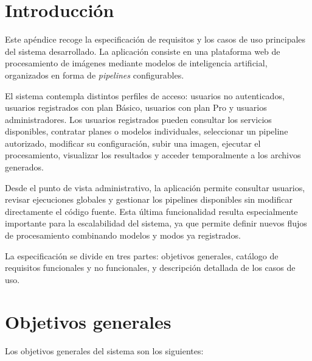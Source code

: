 
\section{Introducción}

Este apéndice recoge la especificación de requisitos y los casos de uso principales del sistema desarrollado. La aplicación consiste en una plataforma web de procesamiento de imágenes mediante modelos de inteligencia artificial, organizados en forma de \emph{pipelines} configurables.

El sistema contempla distintos perfiles de acceso: usuarios no autenticados, usuarios registrados con plan Básico, usuarios con plan Pro y usuarios administradores. Los usuarios registrados pueden consultar los servicios disponibles, contratar planes o modelos individuales, seleccionar un pipeline autorizado, modificar su configuración, subir una imagen, ejecutar el procesamiento, visualizar los resultados y acceder temporalmente a los archivos generados.

Desde el punto de vista administrativo, la aplicación permite consultar usuarios, revisar ejecuciones globales y gestionar los pipelines disponibles sin modificar directamente el código fuente. Esta última funcionalidad resulta especialmente importante para la escalabilidad del sistema, ya que permite definir nuevos flujos de procesamiento combinando modelos y modos ya registrados.

La especificación se divide en tres partes: objetivos generales, catálogo de requisitos funcionales y no funcionales, y descripción detallada de los casos de uso.

\section{Objetivos generales}

Los objetivos generales del sistema son los siguientes:

